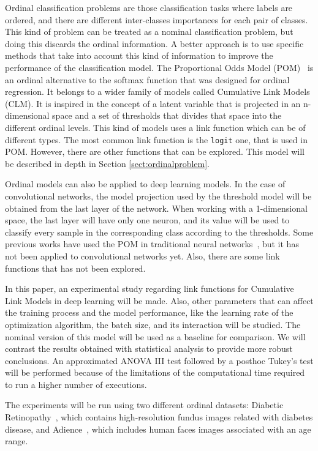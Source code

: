 \documentclass[journal]{IEEEtran}
\begin{document}
	Ordinal classification problems are those classification tasks where labels are ordered, and there are different inter-classes importances for each pair of classes. This kind of problem can be treated as a nominal classification problem, but doing this discards the ordinal information. A better approach is to use specific methods that take into account this kind of information to improve the performance of the classification model. The Proportional Odds Model (POM)~\cite{agresti2010analysis} is an ordinal alternative to the softmax function that was designed for ordinal regression. It belongs to a wider family of models called Cumulative Link Models (CLM). It is inspired in the concept of a latent variable that is projected in an n-dimensional space and a set of thresholds that divides that space into the different ordinal levels. This kind of models uses a link function which can be of different types. The most common link function is the \texttt{logit} one, that is used in POM. However, there are other functions that can be explored. This model will be described in depth in Section \ref{sect:ordinalproblem}.
	
	Ordinal models can also be applied to deep learning models. In the case of convolutional networks, the model projection used by the threshold model will be obtained from the last layer of the network. When working with a 1-dimensional space, the last layer will have only one neuron, and its value will be used to classify every sample in the corresponding class according to the thresholds. Some previous works have used the POM in traditional neural networks~\cite{gutierrez2016ordinal}, but it has not been applied to convolutional networks yet. Also, there are some link functions that has not been explored.
	
	In this paper, an experimental study regarding link functions for Cumulative Link Models in deep learning will be made. Also, other parameters that can affect the training process and the model performance, like the learning rate of the optimization algorithm, the batch size, and its interaction will be studied. The nominal version of this model will be used as a baseline for comparison. We will contrast the results obtained with statistical analysis to provide more robust conclusions. An approximated ANOVA III \cite{miller1997beyond} test followed by a posthoc Tukey's test \cite{tukey1949comparing} will be performed because of the limitations of the computational time required to run a higher number of executions.
	
	The experiments will be run using two different ordinal datasets: Diabetic Retinopathy~\cite{de2018weighted}, which contains high-resolution fundus images related with diabetes disease, and Adience~\cite{beckham2017unimodal}, which includes human faces images associated with an age range.
	
\end{document}
